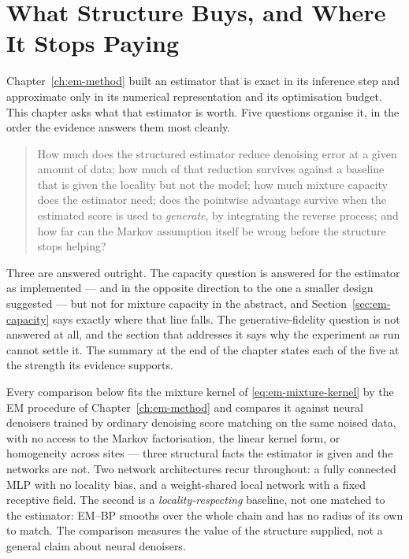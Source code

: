%

\chapter{What Structure Buys, and Where It Stops Paying}
\label{ch:em-results}

Chapter~\ref{ch:em-method} built an estimator that is exact in its inference
step and approximate only in its numerical representation and its
optimisation budget. This chapter asks what that estimator is worth. Five
questions organise it, in the order the evidence answers them most cleanly.

\begin{quote}
How much does the structured estimator reduce denoising error at a given
amount of data; how much of that reduction survives against a baseline that is
given the locality but not the model; how much mixture capacity does the
estimator need; does the pointwise advantage survive when the estimated score
is used to \emph{generate}, by integrating the reverse process; and how far can
the Markov assumption itself be wrong before the structure stops helping?
\end{quote}

\noindent Three are answered outright. The capacity question is answered for
the estimator as implemented --- and in the opposite direction to the one a
smaller design suggested --- but not for mixture capacity in the abstract, and
Section~\ref{sec:em-capacity} says exactly where that line falls. The
generative-fidelity question is not answered at all, and the section that
addresses it says why the experiment as run cannot settle it. The summary at the
end of the chapter states each of the five at the strength its evidence
supports.

Every comparison below fits the mixture kernel of \eqref{eq:em-mixture-kernel}
by the EM procedure of Chapter~\ref{ch:em-method} and compares it against
neural denoisers trained by ordinary denoising score matching on the same
noised data, with no access to the Markov factorisation, the linear kernel
form, or homogeneity across sites --- three structural facts the estimator is
given and the networks are not. Two network architectures recur throughout: a
fully connected MLP with no locality bias, and a weight-shared local network
with a fixed receptive field. The second is a \emph{locality-respecting}
baseline, not one matched to the estimator: EM--BP smooths over the whole chain
and has no radius of its own to match. The comparison measures the value of the
structure supplied, not a general claim about neural denoisers.

